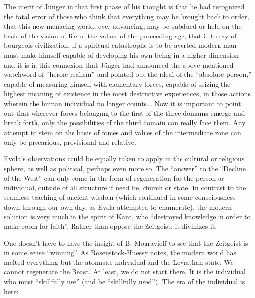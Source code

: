 \begin{quotex}
The merit of Jünger in that first phase of his thought is that he had rec\-og\-nized the fatal error of those who think that every\-thing may be brought back to order, that this new men\-ac\-ing world, ever advanc\-ing, may be sub\-dued or held on the basis of the vision of life of the val\-ues of the pro\-ceed\-ing age, that is to say of bour\-geois civ\-i\-liza\-tion. If a spir\-i\-tual cat\-a\-stro\-phe is to be averted mod\-ern man must make him\-self capa\-ble of devel\-op\-ing his own being in a higher dimen\-sion -- and it is in this con\-nex\-ion that Jünger had announced the above-mentioned watch\-word of ``heroic real\-ism'' and pointed out the ideal of the ``absolute per\-son,'' capa\-ble of mea\-sur\-ing him\-self with ele\-men\-tary forces, capa\-ble of seiz\-ing the high\-est mean\-ing of exis\-tence in the most destruc\-tive expe\-ri\-ences, in those actions wherein the human indi\-vid\-ual no longer counts... Now it is impor\-tant to point out that wher\-ever forces belong\-ing to the first of the three domains emerge and break forth, only the pos\-si\-bil\-i\-ties of the third domain can really face them. Any attempt to stem on the basis of forces and val\-ues of the inter\-me\-di\-ate zone can only be pre\-car\-i\-ous, pro\-vi\-sional and rel\-a\-tive.
\end{quotex}


Evola's observations could be equally taken to apply in the cultural or religious sphere, as well as political, perhaps even more so. The ``answer'' to the ``Decline of the West'' can only come in the form of regeneration for the person or individual, outside of all structure if need be, church or state. In contrast to the seamless teaching of ancient wisdom (which continued in some consciousness down through our own day, as Evola attempted to enumerate), the modern solution is very much in the spirit of Kant, who ``destroyed knowledge in order to make room for faith''. Rather than oppose the Zeitgeist, it divinizes it.

One doesn't have to have the insight of B. Mouravieff to see that the Zeitgeist is in some sense ``winning''. As Rosenstock-Huessy notes, the modern world has melted everything but the atomistic individual and the Leviathan state. We cannot regenerate the Beast. At least, we do not start there. It is the individual who must ``skillfully use'' (and be ``skillfully used''). The era of the individual is here:

